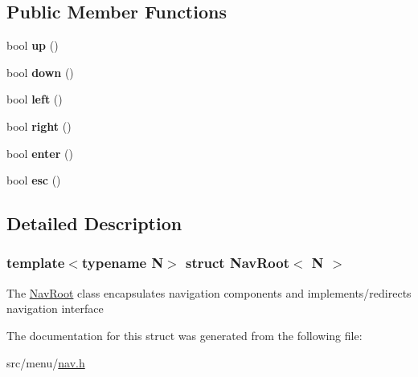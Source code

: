\subsection*{Public Member Functions}
\begin{DoxyCompactItemize}
\item 
\mbox{\label{structNavRoot_a9561689a3b3e22e2bd2b7d2e81d4f60e}} 
bool {\bfseries up} ()
\item 
\mbox{\label{structNavRoot_a49465832033d1ca3d67d4185cd5064d0}} 
bool {\bfseries down} ()
\item 
\mbox{\label{structNavRoot_a030d817943c956afa8f1465b8f085d0d}} 
bool {\bfseries left} ()
\item 
\mbox{\label{structNavRoot_abdf3abf63db594400824b56a9eed2c03}} 
bool {\bfseries right} ()
\item 
\mbox{\label{structNavRoot_a3e808af28e2f4d43710309e20a4ca3ee}} 
bool {\bfseries enter} ()
\item 
\mbox{\label{structNavRoot_a1c713f594a04d9159dd317bbb8c76e43}} 
bool {\bfseries esc} ()
\end{DoxyCompactItemize}


\subsection{Detailed Description}
\subsubsection*{template$<$typename N$>$\newline
struct Nav\+Root$<$ N $>$}

The \hyperlink{structNavRoot}{Nav\+Root} class encapsulates navigation components and implements/redirects navigation interface 

The documentation for this struct was generated from the following file\+:\begin{DoxyCompactItemize}
\item 
src/menu/\hyperlink{nav_8h}{nav.\+h}\end{DoxyCompactItemize}
